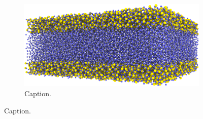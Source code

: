 \begin{figure}[htpb]
\begin{subfigure}[b]{\myfigwidth}
        \centering%
        \includegraphics[width=\textwidth]{images/systems/trimmed-flat_fracture03_03}%
        \caption{Caption.}%
    \end{subfigure}%
    \caption{%
        Caption. %
        \label{fig:flat_fractures}%
    }%
\end{figure}%
%
%
\FloatBarrier
%
